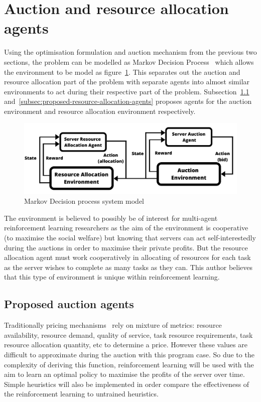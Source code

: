 \section{Auction and resource allocation agents}\label{sec:proposed-agents}
Using the optimisation formulation and auction mechanism from the previous two sections, the problem can be modelled as
Markov Decision Process~\citep{Bel} which allows the environment to be model as figure~\ref{fig:mdp_system_model}.
This separates out the auction and resource allocation part of the problem with
separate agents into almost similar environments to act during their respective part of the problem.
Subsection~\ref{subsec:proposed-auction-agents} and~\ref{subsec:proposed-resource-allocation-agents} proposes agents
for the auction environment and resource allocation environment respectively.

\begin{figure}
    \centering
    \includegraphics[width=14cm]{figures/2_solution_figs/flexible_resource_allocation_env.pdf}
    \caption{Markov Decision process system model}
    \label{fig:mdp_system_model}
\end{figure}

The environment is believed to possibly be of interest for multi-agent reinforcement learning researchers as the aim
of the environment is cooperative (to maximise the social welfare) but knowing that servers can act self-interestedly
during the auctions in order to maximise their private profits. But the resource allocation agent must work
cooperatively in allocating of resources for each task as the server wishes to complete as many tasks as they can.
This author believes that this type of environment is unique within reinforcement learning.

\subsection{Proposed auction agents}\label{subsec:proposed-auction-agents}
Traditionally pricing mechanisms~\citep{al2013cloud} rely on mixture of metrics: resource availability, resource demand,
quality of service, task resource requirements, task resource allocation quantity, etc to determine a price. However
these values are difficult to approximate during the auction with this program case. So due to the complexity of
deriving this function, reinforcement learning will be used with the aim to learn an optimal policy to maximise the
profits of the server over time. Simple heuristics will also be implemented in order compare the effectiveness of the
reinforcement learning to untrained heuristics.

